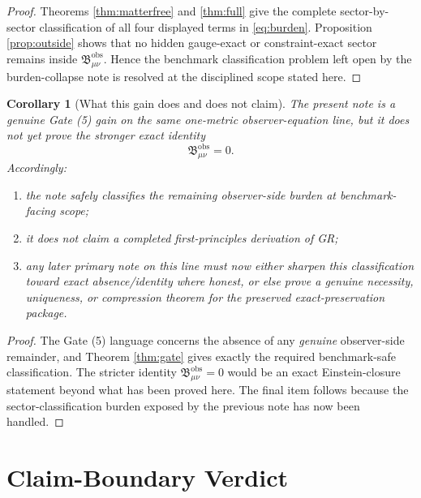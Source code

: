 \documentclass[11pt]{article}
\newcommand{\ObsBurden}{\mathfrak B_{\mu\nu}^{\mathrm{obs}}}
\newtheorem{corollary}{Corollary}
\begin{document}
\begin{proof}
Theorems \ref{thm:matterfree} and \ref{thm:full} give the complete sector-by-sector classification of all four displayed terms in \eqref{eq:burden}. Proposition \ref{prop:outside} shows that no hidden gauge-exact or constraint-exact sector remains inside \(\ObsBurden\). Hence the benchmark classification problem left open by the burden-collapse note is resolved at the disciplined scope stated here.
\end{proof}

\begin{corollary}[What this gain does and does not claim]
\label{cor:scope}
The present note is a genuine Gate (5) gain on the same one-metric observer-equation line, but it does not yet prove the stronger exact identity
\[
\ObsBurden=0.
\]
Accordingly:
\begin{enumerate}
    \item the note safely classifies the remaining observer-side burden at benchmark-facing scope;
    \item it does not claim a completed first-principles derivation of GR;
    \item any later primary note on this line must now either sharpen this classification toward exact absence/identity where honest, or else prove a genuine necessity, uniqueness, or compression theorem for the preserved exact-preservation package.
\end{enumerate}
\end{corollary}

\begin{proof}
The Gate (5) language concerns the absence of any \emph{genuine} observer-side remainder, and Theorem \ref{thm:gate} gives exactly the required benchmark-safe classification. The stricter identity \(\ObsBurden=0\) would be an exact Einstein-closure statement beyond what has been proved here. The final item follows because the sector-classification burden exposed by the previous note has now been handled.
\end{proof}

\section{Claim-Boundary Verdict}
\end{document}
